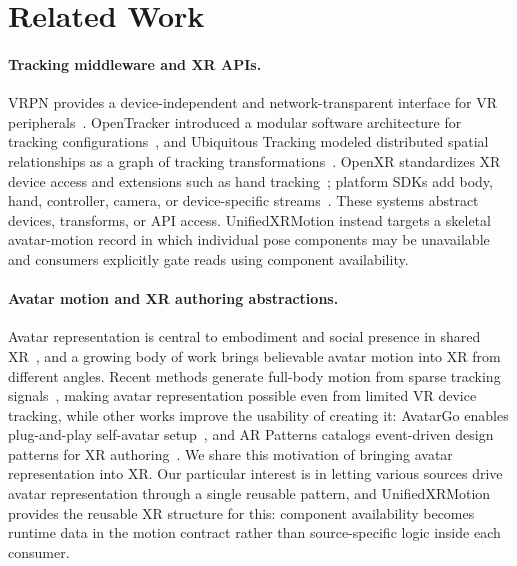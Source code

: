 \documentclass[runningheads]{llncs}
\begin{document}
\section{Related Work}\label{sec:related}
\paragraph{Tracking middleware and XR APIs.}
VRPN provides a device-independent and network-transparent interface for VR peripherals~\cite{taylor2001vrpn}. OpenTracker introduced a modular software architecture for tracking configurations~\cite{reitmayr2001openarchitecture}, and Ubiquitous Tracking modeled distributed spatial relationships as a graph of tracking transformations~\cite{newman2004ubiquitous}. OpenXR standardizes XR device access and extensions such as hand tracking~\cite{khronos_openxr_1_0,openxr_ext_hand}; platform SDKs add body, hand, controller, camera, or device-specific streams~\cite{meta_and_openxr_2025}. These systems abstract devices, transforms, or API access. UnifiedXRMotion instead targets a skeletal avatar-motion record in which individual pose components may be unavailable and consumers explicitly gate reads using component availability.

\paragraph{Avatar motion and XR authoring abstractions.}

  Avatar representation is central to embodiment and social presence in shared XR~\cite{yun2023animationfidelity,baker2021avatar,weidner2023avatarsagents}, and a growing body of work brings believable avatar motion into XR from different angles.
  Recent methods generate full-body motion from sparse tracking signals~\cite{jiang2022avatarposer,dai2024hmd,yang2021lobstr,starke2024categorical}, making avatar representation possible even from limited VR device tracking, while other works improve the usability of creating it: AvatarGo enables plug-and-play self-avatar setup~\cite{ponton2022avatargo}, and AR Patterns catalogs event-driven design patterns for XR authoring~\cite{ackermann2023arpatterns}.
  We share this motivation of bringing avatar representation into XR.
  Our particular interest is in letting various sources drive avatar representation through a single reusable pattern, and UnifiedXRMotion provides the reusable XR structure for this: component availability becomes runtime data in the motion contract rather than source-specific logic inside each consumer.
\end{document}
